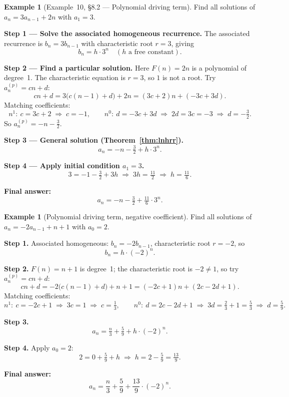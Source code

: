 \documentclass[11pt, a4paper, notitlepage]{report}
\theoremstyle{definition}
\newtheorem{example}[theorem]{Example}
\theoremstyle{remark}
\begin{document}
\begin{example}[Example~10, \S8.2 --- Polynomial driving term]
\label{ex:lnhrr-ex10}
Find all solutions of $a_n = 3a_{n-1} + 2n$ with $a_1 = 3$.

\medskip\noindent\textbf{Step 1 --- Solve the associated homogeneous recurrence.}
The associated recurrence is $b_n = 3b_{n-1}$ with characteristic root $r = 3$, giving
\[
  b_n = h \cdot 3^n \quad (h \text{ a free constant}).
\]

\medskip\noindent\textbf{Step 2 --- Find a particular solution.}
Here $F(n) = 2n$ is a polynomial of degree~1.  The characteristic equation is $r = 3$,
so $1$ is not a root.  Try $a_n^{(p)} = cn + d$:
\[
  cn + d = 3\bigl(c(n-1)+d\bigr) + 2n = (3c+2)n + (-3c+3d).
\]
Matching coefficients:
\[
  n^1{:}\ c = 3c + 2 \;\Rightarrow\; c = -1, \qquad
  n^0{:}\ d = -3c + 3d \;\Rightarrow\; 2d = 3c = -3 \;\Rightarrow\; d = -\tfrac{3}{2}.
\]
So $a_n^{(p)} = -n - \tfrac{3}{2}$.

\medskip\noindent\textbf{Step 3 --- General solution (Theorem~\ref{thm:lnhrr}).}
\[
  a_n = -n - \tfrac{3}{2} + h \cdot 3^n.
\]

\medskip\noindent\textbf{Step 4 --- Apply initial condition $a_1 = 3$.}
\[
  3 = -1 - \tfrac{3}{2} + 3h \;\Rightarrow\; 3h = \tfrac{11}{2} \;\Rightarrow\; h = \tfrac{11}{6}.
\]

\medskip\noindent\textbf{Final answer:}
\[
  \boxed{a_n = -n - \tfrac{3}{2} + \tfrac{11}{6}\cdot 3^n.}
\]
\end{example}

\begin{example}[Polynomial driving term, negative coefficient]
\label{ex:lnhrr-neg}
Find all solutions of $a_n = -2a_{n-1} + n + 1$ with $a_0 = 2$.

\medskip\noindent\textbf{Step 1.}
Associated homogeneous: $b_n = -2b_{n-1}$, characteristic root $r = -2$, so
\[
  b_n = h \cdot (-2)^n.
\]

\medskip\noindent\textbf{Step 2.}
$F(n) = n+1$ is degree~1; the characteristic root is $-2 \neq 1$, so try $a_n^{(p)} = cn + d$:
\[
  cn + d = -2\bigl(c(n-1)+d\bigr) + n + 1 = (-2c+1)n + (2c - 2d + 1).
\]
Matching coefficients:
\[
  n^1{:}\ c = -2c+1 \;\Rightarrow\; 3c = 1 \;\Rightarrow\; c = \tfrac{1}{3},\qquad
  n^0{:}\ d = 2c - 2d + 1 \;\Rightarrow\; 3d = \tfrac{2}{3}+1 = \tfrac{5}{3}
         \;\Rightarrow\; d = \tfrac{5}{9}.
\]

\medskip\noindent\textbf{Step 3.}
\[
  a_n = \tfrac{n}{3} + \tfrac{5}{9} + h\cdot(-2)^n.
\]

\medskip\noindent\textbf{Step 4.} Apply $a_0 = 2$:
\[
  2 = 0 + \tfrac{5}{9} + h \;\Rightarrow\; h = 2 - \tfrac{5}{9} = \tfrac{13}{9}.
\]

\medskip\noindent\textbf{Final answer:}
\[
  \boxed{a_n = \frac{n}{3} + \frac{5}{9} + \frac{13}{9}\cdot(-2)^n.}
\]
\end{example}
\end{document}
